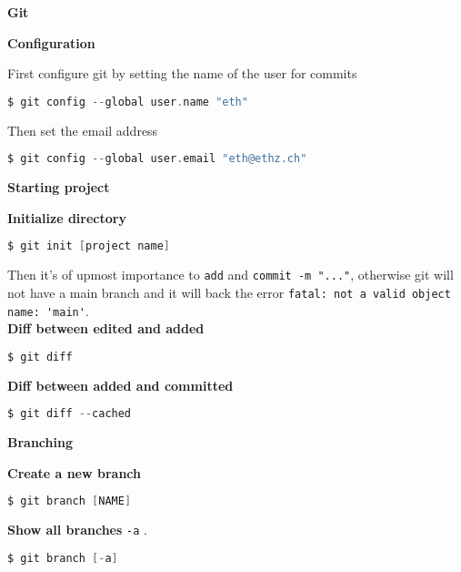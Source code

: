\documentclass[fontsize=8pt, a4paper, landscape, fleqn]{scrartcl}
\renewcommand{\section}[1]{%
    \noindent\colorbox{sectioncolor}{%
        \parbox{\dimexpr\columnwidth-2\fboxsep}{\color{white}\textbf{#1}}}%
    \vspace{0.5mm}%
}
\renewcommand{\subsection}[1]{%
    \noindent\colorbox{subsectioncolor}{%
        \parbox{\dimexpr\columnwidth-2\fboxsep}{\color{white}\textbf{#1}}}%
    \vspace{0.5mm}%
}
\begin{document}
	\begin{multicols*}{3}[\raggedcolumns]
 
	\section{Git}
	\subsection{Configuration}
    First configure git by setting the name of the user for commits
    \begin{lstlisting}[language=C, breaklines]
    $ git config --global user.name "eth" \end{lstlisting}
    Then set the email address
    \begin{lstlisting}[language=C, breaklines]
    $ git config --global user.email "eth@ethz.ch" \end{lstlisting}
    
    \subsection{Starting project}
    \textbf{Initialize directory}
    \begin{lstlisting}[language=C, breaklines]
    $ git init [project name] \end{lstlisting}
    Then it's of upmost importance to \lstinline{add} and \lstinline{commit -m "..."}, otherwise git will not have a main branch and it will back the error \lstinline{fatal: not a valid object name: 'main'}.\\
    \textbf{Diff between edited and added}
    \begin{lstlisting}[language=C, breaklines]
    $ git diff \end{lstlisting}
    
    \textbf{Diff between added and committed}
    \begin{lstlisting}[language=C, breaklines]
    $ git diff --cached\end{lstlisting}
    
    \subsection{Branching}
    \textbf{Create a new branch}
    \begin{lstlisting}[language=C, breaklines]
    $ git branch [NAME] \end{lstlisting}
    
    \textbf{Show all branches} \lstinline{-a} .
    \begin{lstlisting}[language=C, breaklines]
    $ git branch [-a] \end{lstlisting}


\end{multicols*}
\end{document}
